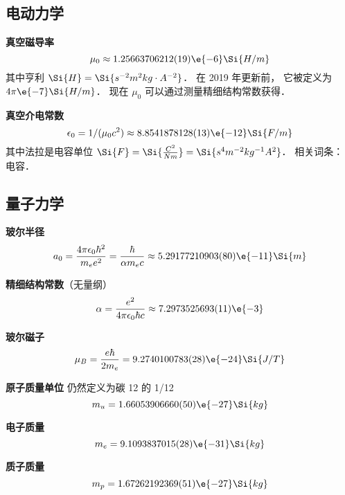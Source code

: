 \subsection{电动力学}

\textbf{真空磁导率}
\begin{equation}
\mu_0 \approx 1.25663706212(19)\e{-6} \Si{H/m}
\end{equation}
其中亨利 $\Si{H} = \Si{s^{-2}m^2 kg \cdot A^{-2}}$． 在 2019 年更新前， 它被定义为 $4\pi\e{-7} \Si{H/m}$． 现在 $\mu_0$ 可以通过测量精细结构常数获得．

\textbf{真空介电常数}
\begin{equation}
\epsilon_0 = 1/(\mu_0 c^2) \approx 8.8541878128(13)\e{-12} \Si{F/m}
\end{equation}
其中法拉是电容单位 $\Si{F} =\Si{\frac{C^2}{N m}} = \Si{s^4 m^{-2} kg^{-1} A^2}$． 相关词条： 电容．

\subsection{量子力学}
\textbf{玻尔半径}
\begin{equation}
a_0 = \frac{4\pi \epsilon_0 \hbar^2}{m_e e^2} = \frac{\hbar}{\alpha m_e c} \approx 5.29177210903(80)\e{-11}\Si{m}
\end{equation}

\textbf{精细结构常数}（无量纲）
\begin{equation}
\alpha = \frac{e^2}{4\pi\epsilon_0\hbar c} \approx 7.2973525693(11)\e{-3}
\end{equation}

\textbf{玻尔磁子}
\begin{equation}
\mu_B = \frac{e\hbar}{2m_e} = 9.2740100783(28)\e{-24} \Si{J/T}
\end{equation}

\textbf{原子质量单位}
仍然定义为碳 12 的 1/12
\begin{equation}
m_u = 1.66053906660(50)\e{-27} \Si{kg}
\end{equation}


\textbf{电子质量}
\begin{equation}\label{Consts_eq1}
m_e = 9.1093837015(28)\e{-31} \Si{kg}
\end{equation}

\textbf{质子质量}
\begin{equation}\label{Consts_eq2}
m_p = 1.67262192369(51)\e{-27}\Si{kg}
\end{equation}

